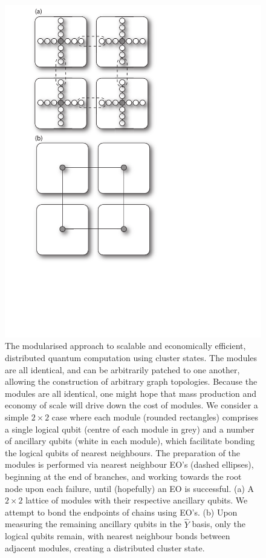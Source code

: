 \documentclass[aps,rmp,twocolumn,amsmath,amssymb,nofootinbib,superscriptaddress]{revtex4}
\begin{document}
\begin{figure}[!htb]
\includegraphics[width=0.8\columnwidth]{module}
\caption{The modularised approach to scalable and economically efficient, distributed quantum computation using cluster states. The modules are all identical, and can be arbitrarily patched to one another, allowing the construction of arbitrary graph topologies. Because the modules are all identical, one might hope that mass production and economy of scale will drive down the cost of modules. We consider a simple \mbox{$2\times 2$} case where each module (rounded rectangles) comprises a single logical qubit (centre of each module in grey) and a number of ancillary qubits (white in each module), which facilitate bonding the logical qubits of nearest neighbours. The preparation of the modules is performed via nearest neighbour EO's (dashed ellipses), beginning at the end of branches, and working towards the root node upon each failure, until (hopefully) an EO is successful. (a) A \mbox{$2\times 2$} lattice of modules with their respective ancillary qubits. We attempt to bond the endpoints of chains using EO's. (b) Upon measuring the remaining ancillary qubits in the $\hat{Y}$ basis, only the logical qubits remain, with nearest neighbour bonds between adjacent modules, creating a distributed cluster state.} \label{fig:module}
\end{figure}
\end{document}
